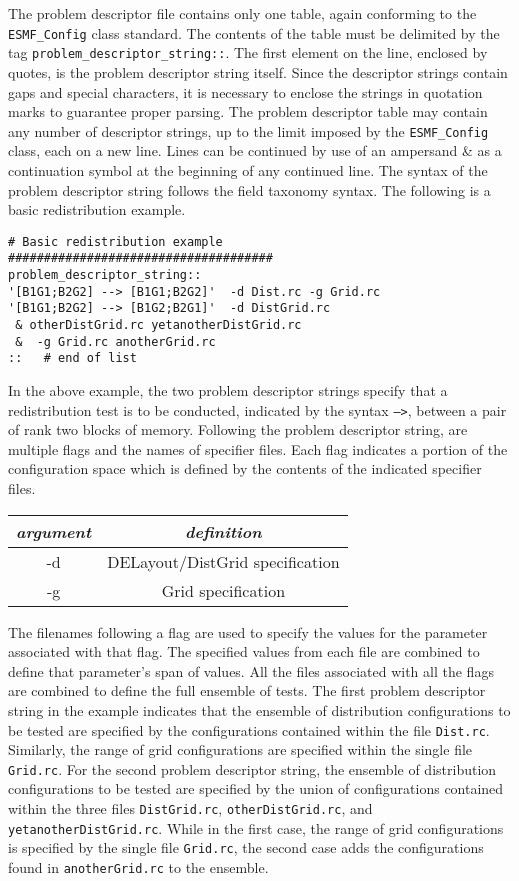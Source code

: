The problem descriptor file contains only one table, again conforming to the \texttt{ESMF\_Config} class standard. 
The contents of the table must be delimited by the tag \texttt{problem\_descriptor\_string::}. 
The first element on the line, enclosed by quotes, is the problem descriptor string itself. 
Since the descriptor strings contain gaps and special characters, it is necessary 
to enclose the strings in quotation marks to guarantee proper parsing. 
The problem descriptor table may contain any number of descriptor strings, 
up to the limit imposed by the \texttt{ESMF\_Config} class, each on a new line. 
Lines can be continued by use of an ampersand {\&} as a continuation symbol 
at the beginning of any continued line. 
The syntax of the problem descriptor string follows the field taxonomy syntax. 
The following is a basic redistribution example.
\begin{verbatim}
# Basic redistribution example
#####################################
problem_descriptor_string::
'[B1G1;B2G2] --> [B1G1;B2G2]'  -d Dist.rc -g Grid.rc 
'[B1G1;B2G2] --> [B1G2;B2G1]'  -d DistGrid.rc 
 & otherDistGrid.rc yetanotherDistGrid.rc
 &  -g Grid.rc anotherGrid.rc  
::   # end of list
\end{verbatim}
In the above example, the two problem descriptor strings specify that a redistribution test 
is to be conducted, indicated by the syntax  \texttt{-->}, between a pair of rank two blocks of memory. 
Following the problem descriptor string, are multiple flags and the names of specifier files. 
Each flag indicates a portion of the configuration space which is defined by the contents 
of the indicated specifier files.  
\begin{center}
\begin{tabular}{| c | c |} \hline
{\em argument } & {\em definition} \\
\hline \hline
-d & DELayout/DistGrid specification \\
-g & Grid specification \\
\hline 
\end{tabular}
\end{center}
The filenames following a flag are used to specify the values for the parameter associated with that flag. 
The specified values from each file are combined to define that parameter's span of values.  
All the files associated with all the flags are combined to define the full ensemble of tests. 
The first problem descriptor string in the example indicates that the ensemble of distribution 
configurations to be tested are specified by the configurations contained within the file \texttt{Dist.rc}. 
Similarly, the range of grid configurations are specified within the single file \texttt{Grid.rc}. 
For the second problem descriptor string, the ensemble of distribution configurations 
to be tested are specified by the union of configurations contained within the 
three files \texttt{DistGrid.rc}, \texttt{otherDistGrid.rc}, and \texttt{yetanotherDistGrid.rc}. 
While in the first case, the range of grid configurations is specified by the single 
file \texttt{Grid.rc}, the second case adds the configurations found in \texttt{anotherGrid.rc} to the ensemble.


